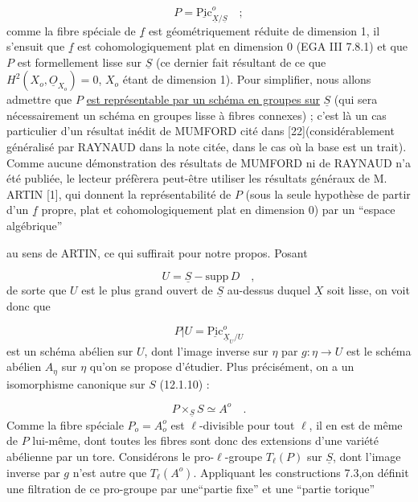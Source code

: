 \begin{equation}\tag{12.8.3}
P = \underline{\mathrm{Pic}}^{o}_{\underline{X}/\underline{S}} \quad ;
\end{equation}
comme la fibre spéciale de $\underline{f}$ est géométriquement réduite de dimension 1, il s'ensuit que $\underline{f}$ est cohomologiquement plat en dimension 0 (EGA III 7.8.1) et que $P$ est formellement lisse sur $\underline{S}$ (ce dernier fait résultant de ce que $H^2(X_o,\underline{O}_{X_o}) = 0$, $X_o$ étant de dimension 1). Pour simplifier, nous allons admettre que $P$ \underline{est représentable par un schéma en groupes sur} $\underline{S}$ (qui sera nécessairement un schéma en groupes lisse à fibres connexes) ; c'est là un cas particulier d'un résultat inédit de MUMFORD cité dans [22](considérablement généralisé par RAYNAUD dans la note citée, dans le cas où la base est un trait). Comme aucune démonstration des résultats de MUMFORD ni de RAYNAUD n'a été publiée, le lecteur préfèrera peut-être utiliser les résultats généraux de M. ARTIN [1], qui donnent la représentabilité de $P$ (sous la seule hypothèse de partir d'un $\underline{f}$ propre, plat et cohomologiquement plat en dimension 0) par un ``espace algébrique''



au sens de ARTIN, ce qui suffirait pour notre propos. Posant

\begin{equation}\tag{12.8.4}
U = \underline{S} - \mathrm{supp}\, D \quad ,
\end{equation}
de sorte que $U$ est le plus grand ouvert de $\underline{S}$ au-dessus duquel $\underline{X}$ soit lisse, on voit donc que

\begin{equation*}
P\vert U = \underline{\mathrm{Pic}}^{o}_{\underline{X}_U/U}
\end{equation*}
est un schéma abélien sur $U$, dont l'image inverse sur $\eta$ par $g : \eta \longrightarrow U$ est le schéma abélien $A_\eta$ sur $\eta$ qu'on se propose d'étudier. Plus précisément, on a un isomorphisme canonique sur $S$ (12.1.10) :

\begin{equation}\tag{12.8.5}
P \times_{\underline{S}} S \simeq A^{o} \quad .
\end{equation}
Comme la fibre spéciale $P_o = A_o^{o}$ est $\ell$-divisible pour tout $\ell$, il en est de même de $P$ lui-même, dont toutes les fibres sont donc des extensions d'une variété abélienne par un tore. Considérons le pro-$\ell$-groupe $T_\ell(P)$ sur $\underline{S}$, dont l'image inverse par $g$ n'est autre que $T_\ell(A^{o})$. Appliquant les constructions 7.3,on définit une filtration de ce pro-groupe par une``partie fixe'' et une ``partie torique''

